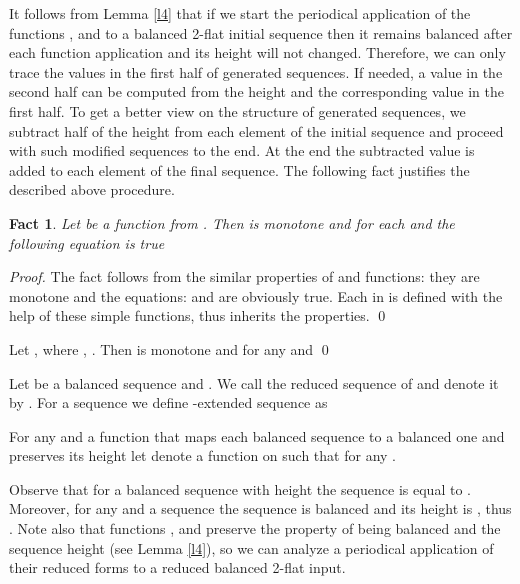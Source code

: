 \documentclass{llncs}
\newtheorem{fact}[theorem]{Fact}
\begin{document}
It follows from Lemma \ref{l4} that if we start the periodical
application of the functions ,  and  to a balanced
2-flat initial sequence then it remains balanced after each function
application and its height will not changed. Therefore, we can only
trace the values in the first half of generated sequences. If needed, a
value in the second half can be computed from the height and the
corresponding value in the first half. To get a better view on the
structure of generated sequences, we subtract half of the height from
each element of the initial sequence and proceed with such modified
sequences to the end. At the end the subtracted value is added to each
element of the final sequence. The following fact justifies the described
above procedure.

\begin{fact}\label{fct-10}
Let  be a function from . Then  is
monotone and for each  and  the following
equation is true

\end{fact}

\begin{proof}
The fact follows from the similar properties of  and 
functions: they are monotone and the equations:  and  are obviously true. Each
 in  is defined with the help of these
simple functions, thus  inherits the properties. \qed
\end{proof}

\begin{corollary}
Let , where , . Then  is monotone and for any  and 
 \qed
\end{corollary} 

\begin{definition} \label{reduce}
Let  be a balanced
sequence and . We call  the reduced
sequence of  and denote it by . For
a sequence  we define
-extended sequence  as

For any  and a function  that maps
each balanced sequence to a balanced one and preserves its height let
 denote a function on  such that
 for any
.
\end{definition}

Observe that for a balanced sequence  with height  the
sequence  is equal to
. Moreover, for any  and a sequence
 the sequence  is balanced
and its height is , thus . Note also that functions ,  and 
preserve the property of being balanced and the sequence height (see
Lemma \ref{l4}), so we can analyze a periodical application of their
reduced forms to a reduced balanced 2-flat input.
\end{document}
